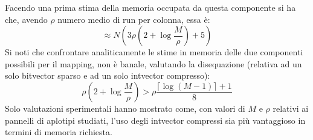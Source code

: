 Facendo una prima stima della memoria occupata da questa componente si ha che,
avendo $\rho$ numero medio di run per colonna, essa è:
\begin{equation}
  \label{eq:mapbvmem}
  \approx N\left(3\rho\left(2+\log\frac{M}{\rho}\right)+5\right)
\end{equation}
Si noti che confrontare analiticamente le stime in memoria delle due componenti
possibili per il mapping, non è banale, valutando la
disequazione (relativa ad un solo bitvector sparso e ad un solo intvector
compresso): 
\begin{equation}
  \label{eq:mapbvintmem}
  \rho\left(2+\log\frac{M}{\rho}\right)>\rho\frac{\lceil\log(M-1)\rceil+1}{8}
\end{equation}
Solo valutazioni sperimentali hanno mostrato come, con valori di $M$ e $\rho$
relativi ai pannelli di aplotipi studiati, l'uso degli intvector compressi sia
più vantaggioso in termini di memoria richiesta.
